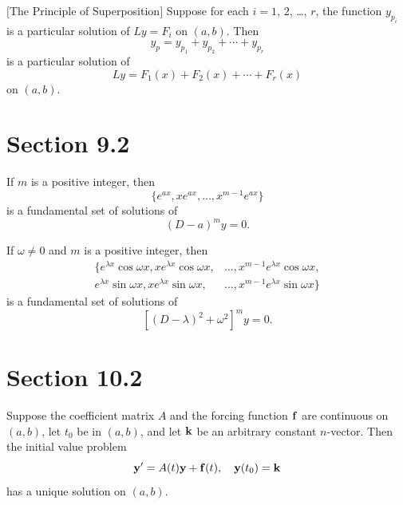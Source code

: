 \setcounter{theorem}{6}
\begin{theorem}
  $[$The Principle of Superposition$]$\label{thmtype:9.1.7} Suppose for each $i=1$, $2$, \dots, $r$,
  the function $y_{p_{i}}$ is a particular solution of $Ly=F_{i}$ on $(a,b)$. Then
  \[
    y_{p}=y_{p_{1}}+y_{p_{2}}+\cdots+y_{p_{r}}
  \]
  is a particular solution of
  \[
    Ly=F_{1}(x)+F_{2}(x)+\cdots+F_{r}(x)
  \]
  on $(a,b)$.
\end{theorem}

\section*{Section 9.2}
\setcounter{chapter}{9}
\setcounter{section}{2}

\setcounter{theorem}{0}
\setcounter{equation}{14}
\begin{theorem}
  \label{thmtype:9.2.1} If $m$ is a positive integer, then
  \begin{equation}
    \label{eq:9.2.15}\{e^{ax},xe^{ax},\dots,x^{m-1}e^{ax}\}
  \end{equation}
  is a fundamental set of solutions of
  \begin{equation}
    \label{eq:9.2.16}(D-a)^{m}y=0.
  \end{equation}
\end{theorem}

\setcounter{theorem}{1}
\begin{theorem}
  \label{thmtype:9.2.2} If $\omega\ne0$ and $m$ is a positive integer, then
  \[
    \begin{array}{rl}
      \{e^{\lambda x}\cos\omega x,xe^{\lambda x}\cos\omega x, & \dots,x^{m-1}e^{\lambda x}\cos\omega x,  \\
      e^{\lambda x}\sin\omega x,xe^{\lambda x}\sin\omega x,   & \dots,x^{m-1}e^{\lambda x}\sin\omega x\}
    \end{array}
  \]
  is a fundamental set of solutions of
  \[
    [(D-\lambda)^{2}+\omega^{2}]^{m}y=0.
  \]
\end{theorem}

\section*{Section 10.2}
{}
\setcounter{chapter}{10}
\setcounter{section}{2}

\setcounter{theorem}{0}
\begin{theorem}
  \label{thmtype:10.2.1} Suppose the coefficient matrix $A$ and the forcing function ${\bf f}$ are
  continuous on $(a,b)$, let $t_{0}$ be in $(a,b)$, and let ${\bf k}$ be an arbitrary constant
  $n$-vector. Then the initial value problem
  \[
    {\bf y}'=A(t){\bf y}+{\bf f}(t),\quad{\bf y}(t_{0})={\bf k}
  \]
  has a unique solution on $(a,b)$.
\end{theorem}

